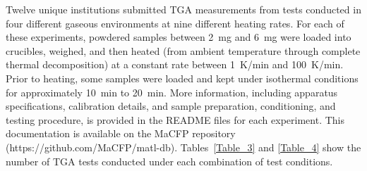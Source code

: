 \documentclass{book}
\begin{document}
Twelve unique institutions submitted TGA measurements from tests conducted in four different gaseous environments at nine different heating rates. For each of these experiments, powdered samples between 2~mg and 6~mg were loaded into crucibles, weighed, and then heated (from ambient temperature through complete thermal decomposition) at a constant rate between 1~K/min and 100~K/min. Prior to heating, some samples were loaded and kept under isothermal conditions for approximately 10~min to 20~min. More information, including  apparatus specifications, calibration details, and sample preparation, conditioning, and testing procedure, is provided in the README files for each experiment. This documentation is available on the MaCFP repository (https://github.com/MaCFP/matl-db). Tables~\ref{Table_3} and \ref{Table_4} show the number of TGA tests conducted under each combination of test conditions.
\end{document}
